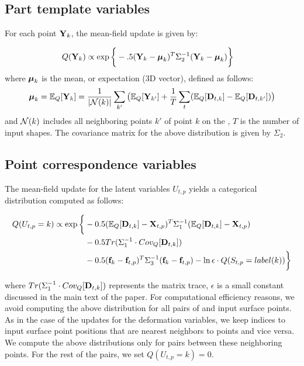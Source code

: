 \subsection{Part template variables}

For each  point $\mathbf{Y}_k$, the mean-field update is given by:

\begin{align*}
& Q(\mathbf{Y}_k) \propto \exp\bigg\{ -.5(\mathbf{Y}_k - \mbox{\boldmath$\mu$}_k )^T \Sigma_2^{-1} ( \mathbf{Y}_k -  \mbox{\boldmath$\mu$}_k )  \bigg\}
\end{align*}
where $\mbox{\boldmath$\mu$}_k$ is the mean, or expectation (3D vector), defined as follows:
\begin{align*}
\mbox{\boldmath$\mu$}_k = \mathbb{E}_Q[\mathbf{Y}_{k}] = \frac{1}{|\mathcal{N}(k)|} \sum\limits_{k'} \big( \mathbb{E}_Q[\mathbf{Y}_{k'}] + \frac{1}{T}\sum\limits_t(\mathbb{E}_Q[\mathbf{D}_{t,k}] - \mathbb{E}_Q[\mathbf{D}_{t,k'}]) \big)
\end{align*}
and $\mathcal{N}(k)$ includes all neighboring points $k'$ of point $k$ on the , $T$ is the number of input shapes. The covariance matrix for the above distribution is given by $\Sigma_2$. 

\subsection{Point correspondence variables}

The mean-field update for the latent variables $U_{t,p}$ yields a categorical distribution computed as follows:

\begin{align*}
Q(U_{t,p} = k) \propto \exp\bigg\{ & - 0.5(\mathbb{E}_Q[\mathbf{D}_{t,k}] - \mathbf{X}_{t,p})^T \Sigma_1^{-1} (\mathbb{E}_Q[\mathbf{D}_{t,k}] - \mathbf{X}_{t,p}) \\ 
& -0.5 Tr( \Sigma_1^{-1} \cdot Cov_Q[\mathbf{D}_{t,k}] ) \\
& -0.5(\mathbf{f}_{k} - \mathbf{f}_{t,p})^T \Sigma_3^{-1} (\mathbf{f}_{k} - \mathbf{f}_{t,p})  - \ln\epsilon \cdot Q(S_{t,p} = label(k)) \bigg\}
\end{align*}

where $Tr( \Sigma_1^{-1} \cdot Cov_Q[\mathbf{D}_{t,k}] )$ represents the matrix trace, $\epsilon$ is a small constant discussed in the main text of the paper. For computational efficiency reasons, we avoid computing the above distribution for all pairs of  and input surface points. As in the case of the updates for the deformation variables,  we keep indices to input surface point positions that are nearest neighbors to  points and vice versa. We compute the above distributions only for pairs between these neighboring points. For the rest of the pairs, we set $Q(U_{t,p}=k) = 0$.

